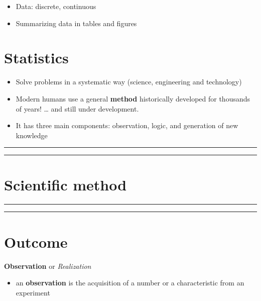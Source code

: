 \documentclass[
]{book}
\providecommand{\tightlist}{%
  \setlength{\itemsep}{0pt}\setlength{\parskip}{0pt}}
\begin{document}
\begin{itemize}
\tightlist
\item
  Data: discrete, continuous
\item
  Summarizing data in tables and figures
\end{itemize}

\hypertarget{statistics}{%
\section{Statistics}\label{statistics}}

\begin{itemize}
\item
  Solve problems in a systematic way (science, engineering and technology)
\item
  Modern humans use a general \textbf{method} historically developed for thousands of years! \ldots{} and still under development.
\item
  It has three main components: observation, logic, and generation of new knowledge
\end{itemize}

\begin{center}\rule{0.5\linewidth}{0.5pt}\end{center}

\begin{center}\rule{0.5\linewidth}{0.5pt}\end{center}

\hypertarget{scientific-method}{%
\section{Scientific method}\label{scientific-method}}

\begin{center}\rule{0.5\linewidth}{0.5pt}\end{center}

\begin{center}\rule{0.5\linewidth}{0.5pt}\end{center}

\hypertarget{outcome}{%
\section{Outcome}\label{outcome}}

\textbf{Observation} or \emph{Realization}

\begin{itemize}
\tightlist
\item
  an \textbf{observation} is the acquisition of a number or a characteristic from an experiment
\end{itemize}
\end{document}

